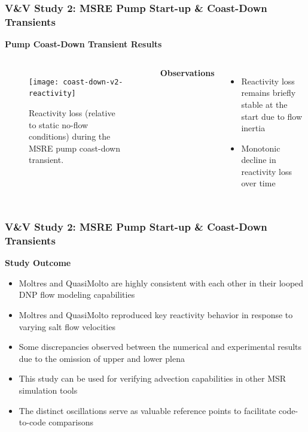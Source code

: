 \begin{frame}
  \frametitle{V\&V Study 2: MSRE Pump Start-up \& Coast-Down Transients}
  \textbf{Pump Coast-Down Transient Results}
  \begin{columns}
  \column{5.5cm}
  \begin{figure}[t]
    \centering
    \texttt{[image: coast-down-v2-reactivity]}
    \caption{Reactivity loss (relative to static no-flow conditions) during the \gls{MSRE} pump
    coast-down transient.}
    \label{fig:start-up-reactivity}
  \end{figure}
  \column{5.5cm}
  \textbf{Observations}
  \begin{itemize}
    \item Reactivity loss remains briefly stable at the start due to flow inertia
    \item Monotonic decline in reactivity loss over time
  \end{itemize}
  \end{columns}
\end{frame}

\begin{frame}
  \frametitle{V\&V Study 2: MSRE Pump Start-up \& Coast-Down Transients}
  \textbf{Study Outcome}
  \begin{itemize}
    \item Moltres and QuasiMolto are highly consistent with each other in their looped DNP flow
      modeling capabilities
    \item Moltres and QuasiMolto reproduced key reactivity behavior in response to varying salt
      flow velocities
    \item Some discrepancies observed between the numerical and experimental results due to the
      omission of upper and lower plena
    \item This study can be used for verifying advection capabilities in other MSR simulation tools
    \item The distinct oscillations serve as valuable reference points to facilitate code-to-code
      comparisons
  \end{itemize}
\end{frame}
